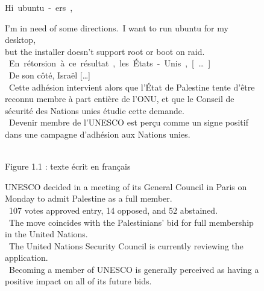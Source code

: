 \begin{figure}
\begin{multicols}{2}

\begin{rhetoricaltext} \footnotesize
\unit[1]{Hi ubuntu-ers,} 

\unit[2]{I'm in need of some directions.} 
\unit[3]{I want to run ubuntu for my desktop, \\
but the installer doesn't support root or boot on raid.  } \\ %
\unit[5]{En rétorsion à ce résultat, les États-Unis, [\ldots]}  \\ %
\unit[7]{De son côté, Israël [\ldots] } \\ %
\unit[8]{Cette adhésion intervient alors que l'État de Palestine tente d'être reconnu membre à part entière de l'ONU, 
et que le Conseil de sécurité des Nations unies étudie cette demande. } \\
\unit[9]{Devenir membre de l'UNESCO est %
perçu comme un signe positif dans une campagne d'adhésion aux Nations unies. } 
\end{rhetoricaltext}
\\ Figure 1.1 : texte écrit en français
\newpage
\begin{rhetoricaltext} \footnotesize
\unit[10]{UNESCO decided in a meeting of its General Council in Paris on Monday to admit Palestine as a full member.}\\
\unit[11]{107 votes approved entry, 14 opposed, and 52 abstained.}\\
\unit[12]{The move coincides with the Palestinians' bid for full membership in the United Nations. }\\
\unit[13]{The United Nations Security Council is currently reviewing the application. }\\
\unit[14]{Becoming a member of UNESCO is generally perceived as having a positive impact on all of its future bids.}

\end{rhetoricaltext}
\end{multicols}
\end{figure}
